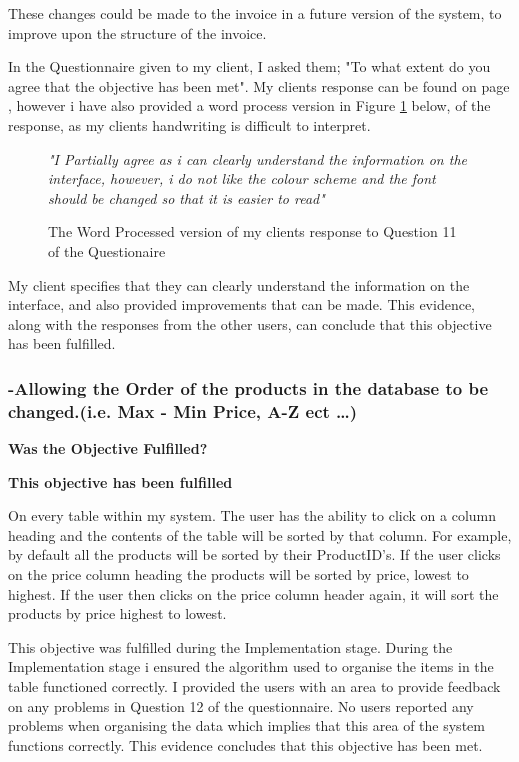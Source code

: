 These changes could be made to the invoice in a future version of the system, to improve upon the structure of the invoice.

In the Questionnaire given to my client, I asked them; "To what extent do you agree that the objective has been met". My clients response can be found on page \pageref{Client-Q11}, however i have also provided a word process version in Figure \ref{response1} below, of the response, as my clients handwriting is difficult to interpret.

 \begin{figure}[H]
\caption{The Word Processed version of my clients response to Question 11 of the Questionaire} \label{response1}

\vspace{3mm}
\textit{\large{"I Partially agree as i can clearly understand the information on the interface, however, i do not like the colour scheme and the font should be changed so that it is easier to read"}}
\end{figure}
\vspace{3mm}

My client specifies that they can clearly understand the information on the interface, and also provided improvements that can be made. This evidence, along with the responses from the other users, can conclude that this objective has been fulfilled.


\pagebreak
\subsubsection{-Allowing the Order of the products in the database to be changed.(i.e. Max - Min Price, A-Z ect \ldots)}
\textbf{Was the Objective Fulfilled?} \newline

\textbf{\large{This objective has been fulfilled}}

On every table within my system. The user has the ability to click on a column heading and the contents of the table will be sorted by that column. For example, by default all the products will be sorted by their ProductID's. If the user clicks on the price column heading the products will be sorted by price, lowest to highest. If the user then clicks on the price column header again, it will sort the products by price highest to lowest.

This objective was fulfilled during the Implementation stage. During the Implementation stage i ensured the algorithm used to organise the items in the table functioned correctly. I provided the users with an area to provide feedback on any problems in Question 12 of the questionnaire. No users reported any problems when organising the data which implies that this area of the system functions correctly. This evidence concludes that this objective has been met.

